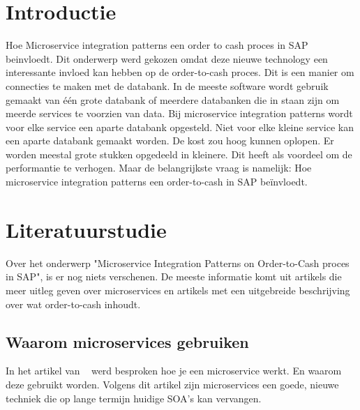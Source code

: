 
\section{Introductie} %
\label{sec:introductie}

Hoe Microservice integration patterns een order to cash proces in SAP beinvloedt. Dit onderwerp werd gekozen omdat deze nieuwe technology een interessante invloed kan hebben op de order-to-cash proces. Dit is een manier om connecties te maken met de databank. In de meeste software wordt gebruik gemaakt van één grote databank of meerdere databanken die in staan zijn om meerde services te voorzien van data. Bij microservice integration patterns wordt voor elke service een aparte databank opgesteld. Niet voor elke kleine service kan een aparte databank gemaakt worden. De kost zou hoog kunnen oplopen. Er worden meestal grote stukken opgedeeld in kleinere. Dit heeft als voordeel om de performantie te verhogen. Maar de belangrijkste vraag is namelijk: Hoe microservice integration patterns een order-to-cash in SAP beïnvloedt.


\section{Literatuurstudie}
\label{sec:state-of-the-art}

Over het onderwerp "Microservice Integration Patterns on Order-to-Cash proces in SAP", is er nog niets verschenen. De meeste informatie komt uit artikels die meer uitleg geven over microservices en artikels met een uitgebreide beschrijving over wat order-to-cash inhoudt.

\subsection{Waarom microservices gebruiken} 
In het artikel van ~\cite{Gunaratne2018} werd besproken hoe je een microservice werkt. En waarom deze gebruikt worden. Volgens dit artikel zijn microservices een goede, nieuwe techniek die op lange termijn huidige SOA's kan vervangen. 

